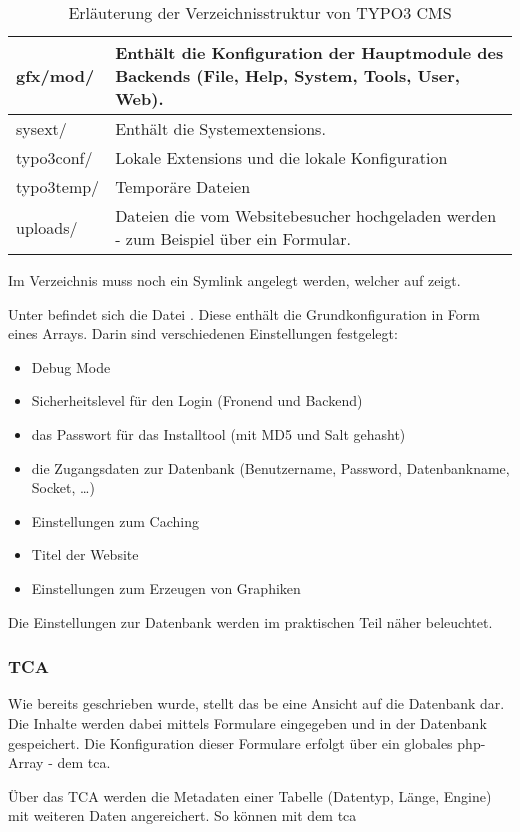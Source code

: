 \begin{table}
\begin{tabularx}{\textwidth}{|X|X|}
		gfx/mod/ & Enthält die Konfiguration der Hauptmodule des Backends (File, Help, System, Tools, User, Web).\\ \hline
		sysext/ & Enthält die Systemextensions.\\ \hline
		typo3conf/ & Lokale Extensions und die lokale Konfiguration\\ \hline
		typo3temp/ & Temporäre Dateien\\ \hline
		uploads/ & Dateien die vom Websitebesucher hochgeladen werden - zum Beispiel über ein Formular.\\ \hline
	\end{tabularx}
	\caption{Erläuterung der Verzeichnisstruktur von TYPO3 CMS}
	\label{tab:typo3FolderStructure}
\end{table}
Im Verzeichnis  muss noch ein Symlink  angelegt werden, welcher auf  zeigt.

Unter  befindet sich die Datei . Diese enthält die Grundkonfiguration in Form eines Arrays. Darin sind verschiedenen Einstellungen festgelegt:
\begin{itemize}
	\item Debug Mode
	\item Sicherheitslevel für den Login (Fronend und Backend)
	\item das Passwort für das Installtool (mit MD5 und Salt gehasht)
	\item die Zugangsdaten zur Datenbank (Benutzername, Password, Datenbankname, Socket, …)
	\item Einstellungen zum Caching
	\item Titel der Website
	\item Einstellungen zum Erzeugen von Graphiken
\end{itemize}

Die Einstellungen zur Datenbank werden im praktischen Teil näher beleuchtet.

\subsubsection{TCA}

Wie bereits geschrieben wurde, stellt das \gls{be} eine Ansicht auf die Datenbank dar. Die Inhalte werden dabei mittels Formulare eingegeben und in der Datenbank gespeichert. Die Konfiguration dieser Formulare erfolgt über ein globales \gls{php}-Array - dem \gls{tca}.

Über das TCA werden die Metadaten einer Tabelle (Datentyp, Länge, Engine) mit weiteren Daten angereichert. So können mit dem \gls{tca}

